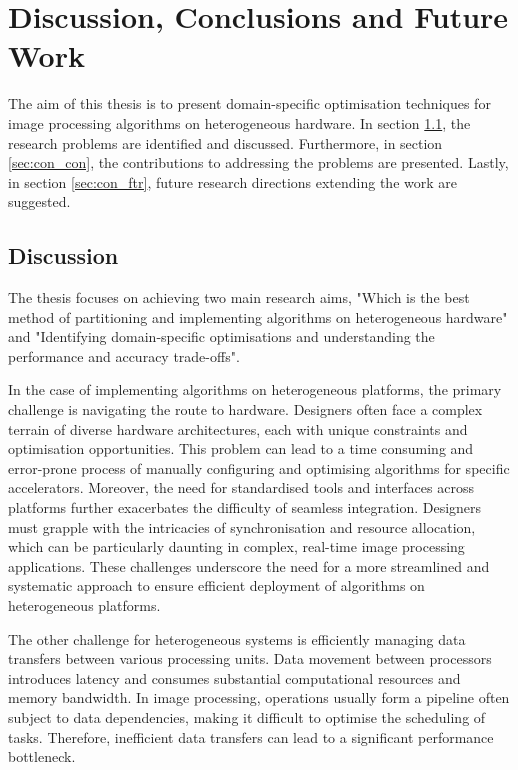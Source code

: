 \chapter{Discussion, Conclusions and Future Work}
\label{chap:concl}
The aim of this thesis is to present domain-specific optimisation techniques for image processing algorithms on heterogeneous hardware. In section \ref{sec:Discussionc}, the research problems are identified and discussed. Furthermore, in section \ref{sec:con_con}, the contributions to addressing the problems are presented. Lastly, in section \ref{sec:con_ftr}, future research directions extending the work are suggested.

\section{Discussion}\label{sec:Discussionc}
The thesis focuses on achieving two main research aims, "Which is the best method of partitioning and implementing algorithms on heterogeneous hardware" and "Identifying domain-specific optimisations and understanding the performance and accuracy trade-offs".

In the case of implementing algorithms on heterogeneous platforms, the primary challenge is navigating the route to hardware. Designers often face a complex terrain of diverse hardware architectures, each with unique constraints and optimisation opportunities. This problem can lead to a time consuming and error-prone process of manually configuring and optimising algorithms for specific accelerators. Moreover, the need for standardised tools and interfaces across platforms further exacerbates the difficulty of seamless integration. Designers must grapple with the intricacies of synchronisation and resource allocation, which can be particularly daunting in complex, real-time image processing applications. These challenges underscore the need for a more streamlined and systematic approach to ensure efficient deployment of algorithms on heterogeneous platforms. 

The other challenge for heterogeneous systems is efficiently managing data transfers between various processing units. Data movement between processors introduces latency and consumes substantial computational resources and memory bandwidth. In image processing, operations usually form a pipeline often subject to data dependencies, making it difficult to optimise the scheduling of tasks. Therefore, inefficient data transfers can lead to a significant performance bottleneck. 

